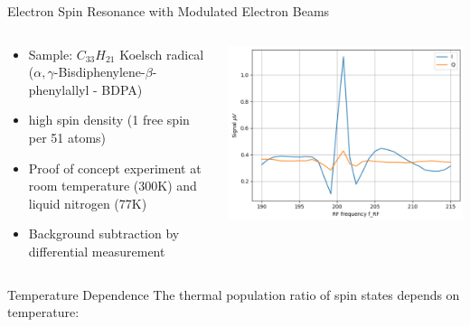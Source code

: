 \documentclass[final]{beamer}
\begin{document}
\begin{frame}[fragile]{}
\begin{columns}[T]
\begin{column}{.49\linewidth}
\begin{block}{\Large Electron Spin Resonance with Modulated Electron Beams}
        \begin{columns}
          \begin{column}{0.6\columnwidth}
            \begin{itemize}
              \item Sample: $C_{33}H_{21}$
                Koelsch radical ($\alpha,\gamma$-Bisdiphenylene-$\beta$-phenylallyl - BDPA)
              \item high spin density (1 free spin per 51 atoms)
              \item Proof of concept experiment at room temperature (300K) and liquid nitrogen (77K)
              \item Background subtraction by differential measurement
            \end{itemize}
          \end{column}
          \begin{column}{0.4\columnwidth}
            \includegraphics[width=\columnwidth]{figures/eprsignal.png}
          \end{column}
        \end{columns}
      \end{block}

      \begin{block}{\Large Temperature Dependence}
        The thermal population ratio of spin states depends on temperature:
        

\end{block}
\end{column}
\end{columns}
\end{frame}
\end{document}
